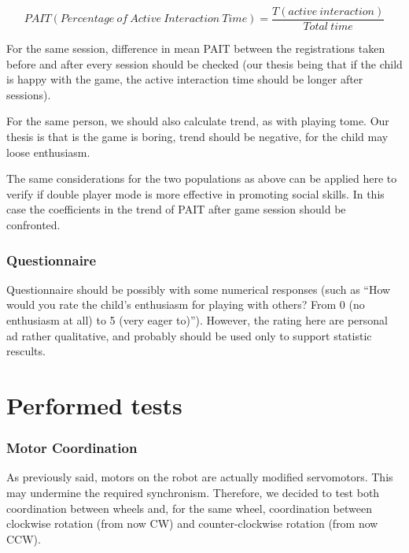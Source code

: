 \documentclass[a4paper,twoside]{book}
\begin{document}
\[PAIT (Percentage\ of\ Active\ Interaction\ Time)=\frac{T(active\ interaction)}{Total\ time}\]

For the same session, difference in mean PAIT between the registrations taken before and after every session should be checked (our thesis being that if the child is happy with the game, the active interaction time should be longer after sessions).

For the same person, we should also calculate trend, as with playing tome. Our thesis is that is the game is boring, trend should be negative, for the child may loose enthusiasm.

The same considerations for the two populations as above can be applied here to verify if double player mode is more effective in promoting social skills. In this case the coefficients in the trend of PAIT after game session should be confronted.

\subsubsection*{Questionnaire}

Questionnaire should be possibly with some numerical responses (such as \textquotedblleft{}How would you rate the child's enthusiasm for playing with others? From 0 (no enthusiasm at all) to 5 (very eager to)\textquotedblright{}). However, the rating here are personal ad rather qualitative, and probably should be used only to support statistic rescults.

\section{Performed tests}

\subsubsection*{Motor Coordination}
\label{ssec:motortest}

As previously said, motors on the robot are actually modified servomotors. This may undermine the required synchronism. Therefore, we decided to test both coordination between wheels and, for the same wheel, coordination between clockwise rotation (from now CW) and counter-clockwise rotation (from now CCW). 
\end{document}

